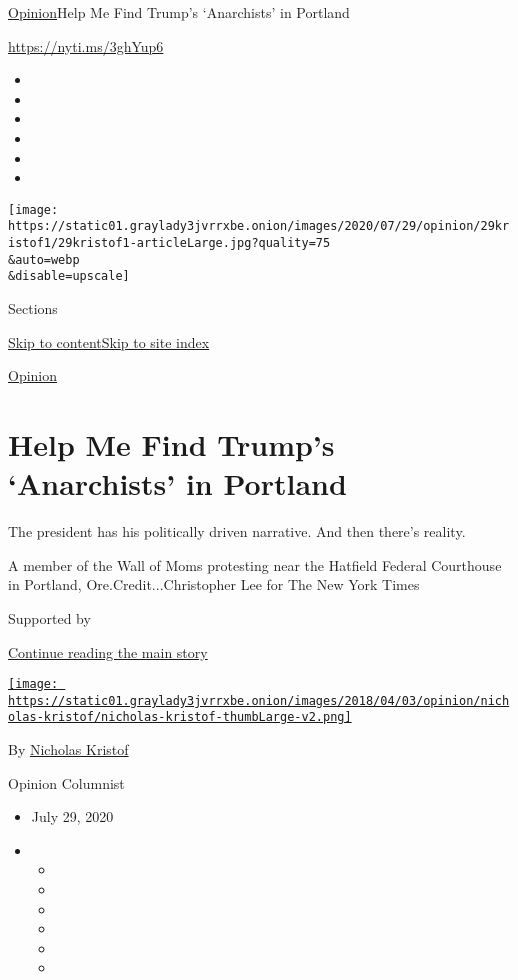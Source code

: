 \href{/section/opinion}{Opinion}\textbar{}Help Me Find Trump's
`Anarchists' in Portland

\url{https://nyti.ms/3ghYup6}

\begin{itemize}
\item
\item
\item
\item
\item
\item
\end{itemize}

\texttt{[image: https://static01.graylady3jvrrxbe.onion/images/2020/07/29/opinion/29kristof1/29kristof1-articleLarge.jpg?quality=75\\\&auto=webp\\\&disable=upscale]}

Sections

\protect\hyperlink{site-content}{Skip to
content}\protect\hyperlink{site-index}{Skip to site index}

\href{/section/opinion}{Opinion}

\hypertarget{help-me-find-trumps-anarchists-in-portland}{%
\section{Help Me Find Trump's `Anarchists' in
Portland}\label{help-me-find-trumps-anarchists-in-portland}}

The president has his politically driven narrative. And then there's
reality.

A member of the Wall of Moms protesting near the Hatfield Federal
Courthouse in Portland, Ore.Credit...Christopher Lee for The New York
Times

Supported by

\protect\hyperlink{after-sponsor}{Continue reading the main story}

\href{https://www.nytimes3xbfgragh.onion/column/nicholas-kristof}{\texttt{[image: https://static01.graylady3jvrrxbe.onion/images/2018/04/03/opinion/nicholas-kristof/nicholas-kristof-thumbLarge-v2.png]}}

By
\href{https://www.nytimes3xbfgragh.onion/column/nicholas-kristof}{Nicholas
Kristof}

Opinion Columnist

\begin{itemize}
\item
  July 29, 2020
\item
  \begin{itemize}
  \item
  \item
  \item
  \item
  \item
  \item
  \end{itemize}
\end{itemize}

